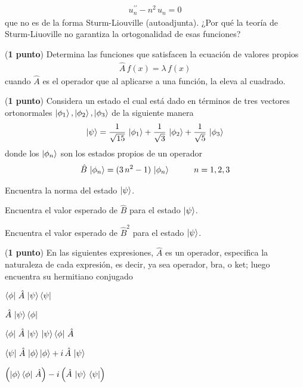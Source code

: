 \begin{milista}
\begin{align*}
u_{n}^{\prime \prime} - n^{2} \, u_{n} = 0
\end{align*}
que no es de la forma Sturm-Liouville (autoadjunta). ¿Por qué la teoría de Sturm-Liuoville no garantiza la ortogonalidad de esas funciones?
\item (\textbf{1 punto}) Determina las funciones que satisfacen la ecuación de valores propios
\begin{align*}
\hat{A} \, f(x) = \lambda \, f(x)
\end{align*}
cuando $\hat{A}$ es el operador que al aplicarse a una función, la eleva al cuadrado.
\item (\textbf{1 punto}) Considera un estado el cual está dado en términos de tres vectores ortonormales $\ket{\phi_{1}}, \ket{\phi_{2}}, \ket{\phi_{3}}$ de la siguiente manera
\begin{align*}
\ket{\psi} = \dfrac{1}{\sqrt{15}} \, \ket{\phi_{1}} + \dfrac{1}{\sqrt{3}} \, \ket{\phi_{2}} + \dfrac{1}{\sqrt{5}} \, \ket{\phi_{3}}
\end{align*}
donde los $\ket{\phi_{n}}$ son los estados propios de un operador 
\begin{align*}
\hat{B} \, \ket{\phi_{n}} = (3 \, n^{2} - 1) \, \ket{\phi_{n}} \hspace{1cm} n = 1, 2, 3
\end{align*}
\begin{milista}
\item Encuentra la norma del estado $\ket{\psi}$.
\item Encuentra el valor esperado de $\hat{B}$ para el estado $\ket{\psi}$.
\item Encuentra el valor esperado de $\hat{B}^{2}$ para el estado $\ket{\psi}$.
\end{milista}
\item (\textbf{1 punto}) En las siguientes expresiones, $\hat{A}$ es un operador, especifica la naturaleza de cada expresión, es decir, ya sea operador, bra, o ket; luego encuentra su hermitiano conjugado
\begin{milista}
\item $\bra{\phi} \, \hat{A} \, \ket{\psi} \bra{\psi}$
\item $\hat{A} \, \ket{\psi} \bra{\phi}$
\item $\bra{\phi} \, \hat{A} \, \ket{\psi} \, \ket{\psi} \bra{\phi} \, \hat{A}$
\item $\bra{\psi} \, \hat{A} \, \ket{\phi} \ket{\phi} + i \, \hat{A} \, \ket{\psi}$
\item $\left( \ket{\phi} \bra{\phi} \, \hat{A} \right) - i \left( \hat{A} \, \ket{\psi} \, \bra{\psi} \right)$

\end{milista}
\end{milista}
